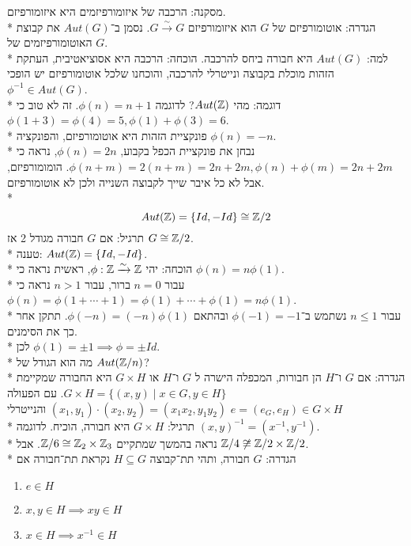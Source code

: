 מסקנה: הרכבה של איזומורפיזמים היא איזומורפיזם. \\*
הגדרה: אוטומורפיזם של $G$ הוא איזומורפיזם $G \xrightarrow{\sim} G$. נסמן ב־$Aut(G)$ את קבוצת האוטומורפיזמים של $G$. \\*
למה: $Aut(G)$ היא חבורה ביחס להרכבה. הוכחה: הרכבה היא אסוציאטיבית, העתקת הזהות מוכלת בקבוצה ונייטרלי להרכבה, והוכחנו שלכל אוטומורפיזם יש הופכי $\phi^{-1} \in Aut(G)$. \\*
דוגמה: מהי $Aut(\mathbb{Z})$? לדוגמה $\phi(n) = n + 1$. זה לא טוב כי $\phi(1 + 3) = \phi(4) = 5, \phi(1) + \phi(3) = 6$. \\*
פונקציית הזהות היא אוטומורפיזם, והפונקציה $\phi(n) = -n$. \\*
נבחן את פונקציית הכפל בקבוע, $\phi(n) = 2n$, נראה כי $\phi(n + m) = 2(n + m) = 2n + 2m, \phi(n) + \phi(m) = 2n + 2m$. הומומורפיזם, אבל לא כל איבר שייך לקבוצה השנייה ולכן לא אוטומורפיזם. \\*
\[
	Aut(\mathbb{Z}) = \{Id, -Id\} \cong \mathbb{Z}/2
\]
תרגיל: אם $G$ חבורה מגודל 2 אז $G \cong \mathbb{Z}/2$. \\*
טענה: $Aut(\mathbb{Z}) = \{Id, -Id\}$. \\*
הוכחה: יהי $\phi : \mathbb{Z} \xrightarrow{\sim} \mathbb{Z}$, ראשית נראה כי $\phi(n) = n\phi(1)$. \\*
עבור $n = 0$ ברור, עבור $ n > 1$ נראה כי $\phi(n) = \phi(1 + \cdots + 1) = \phi(1) + \cdots + \phi(1) = n \phi(1)$. \\*
עבור $n \le 1$ נשתמש ב־$\phi(-1) = -1$ ובהתאם $\phi(-n) = (-n)\phi(1)$. תתקן אחר כך את הסימנים. \\*
לכן $\phi(1) = \pm 1 \implies \phi = \pm Id$. \\*
מה הוא הגודל של $Aut(\mathbb{Z}/n)$? \\*
הגדרה: אם $G$ ו־$H$ הן חבורות, המכפלה הישרה ל $G$ ו־$H$ או $G \times H$ היא החבורה שמקיימת $G \times H = \{ (x, y) \mid x \in G, y \in H \}$.
עם הפעולה $(x_1, y_1) \cdot (x_2, y_2) = (x_1 x_2, y_1 y_2)$ והנייטרלי $e = (e_G, e_H) \in G \times H$ \\*
תרגיל: $G \times H$ היא חבורה, הוכיח. לדוגמה $(x, y)^{-1} = (x^{-1}, y^{-1})$.\\*
נראה בהמשך שמתקיים $\mathbb{Z}/6 \cong \mathbb{Z}_2 \times \mathbb{Z}_3$. אבל $\mathbb{Z}/4 \not\cong \mathbb{Z}/2 \times \mathbb{Z}/2$. \\*
הגדרה: $G$ חבורה, ותהי תת־קבוצה $H \subseteq G$ נקראת תת־חבורה אם
\begin{enumerate}
	\item $e \in H$
	\item $x, y \in H \implies xy \in H$
	\item $x \in H \implies x^{-1} \in H$
\end{enumerate}
